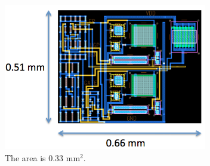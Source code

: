 \documentclass[10pt]{amsart}
\begin{document}
\begin{figure}[H]
	\begin{center}
		\includegraphics[width=3.5in]{Media/area.png}
	\end{center}
	\caption{The area is 0.33 mm$^2$.}
	\label{fig:cc}
\end{figure}
\end{document}
